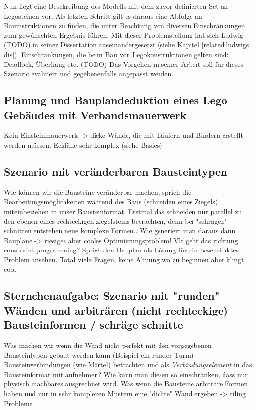 Nun liegt eine Beschreibung des Modells mit dem zuvor definierten Set an Legosteinen vor.
Als letzten Schritt gilt es daraus eine Abfolge an Bauinstruktionen zu finden, die unter Beachtung von diversen Einschränkungen zum gewünschten Ergebnis führen.
Mit dieser Problemstellung hat sich Ludwig (TODO) in  seiner Dissertation auseinandergesetzt (siehe Kapitel \ref{related:ludwigs dis}). 
Einschränkungen, die beim Bau von Legokonstruktionen gelten sind:
Deadlock, Überhang etc. (TODO)
Das Vorgehen in seiner Arbeit soll für dieses Szenario evaluiert und gegebenenfalls angepasst werden.


\subsection{Planung und Bauplandeduktion eines Lego Gebäudes mit Verbandsmauerwerk}
Kein Einsteinmauerwerk -> dicke Wände, die mit Läufern und Bindern erstellt werden müssen.
Eckfälle sehr komplex (siehe Basics)

\subsection{Szenario mit veränderbaren Bausteintypen}
Wie können wir die Bausteine veränderbar machen, sprich die Bearbeitungsmöglichkeiten während des Baus (schneiden eines Ziegels) miteinbeziehen in unser Bausteinformat.
Erstmal das schneiden nur parallel zu den ebenen eines rechteckigen ziegelsteins betrachten, denn bei "schrägen" schnitten entstehen neue komplexe Formen..
Wie generiert man daraus dann Baupläne -> riesiges aber cooles Optimierungsproblem!
Vlt geht das richtung constraint programming? Sprich den Bauplan als Lösung für ein beschränktes Problem ansehen.
Total viele Fragen, keine Ahnung wo zu beginnen aber klingt cool

\subsection{Sternchenaufgabe: Szenario mit "runden" Wänden und arbiträren (nicht rechteckige) Bausteinformen / schräge schnitte}
Was machen wir wenn die Wand nicht perfekt mit den vorgegebenen Bausteintypen gebaut werden kann (Beispiel ein runder Turm)
Bausteinverbindungen (wie Mörtel) betrachten und als \textit{Verbindungselement} in das Bausteinformat mit aufnehmen? Wie kann man diesen so einschränken, dass nur physisch machbares ausgrechnet wird.
Was wenn die Bausteine arbiträre Formen haben und nur in sehr komplexen Mustern eine "dichte" Wand ergeben -> tiling Probleme.